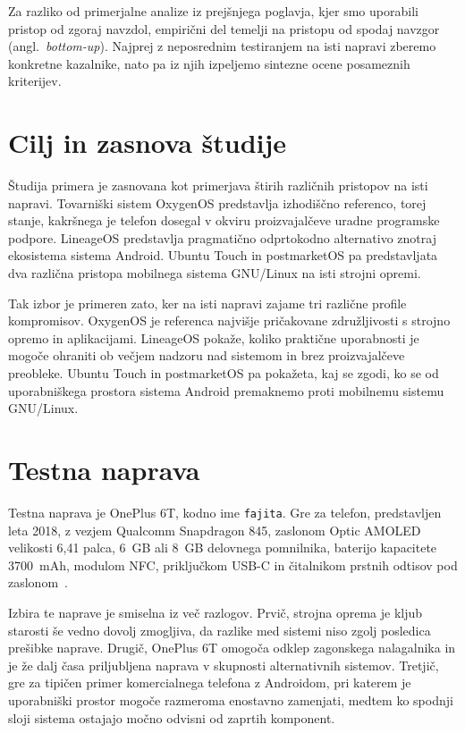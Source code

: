 \documentclass[a4paper,12pt,openright]{book}
\begin{document}
Za razliko od primerjalne analize iz prejšnjega poglavja, kjer smo uporabili pristop od zgoraj navzdol, empirični del temelji na pristopu od spodaj navzgor (angl.~\textit{bottom-up}).
Najprej z neposrednim testiranjem na isti napravi zberemo konkretne kazalnike, nato pa iz njih izpeljemo sintezne ocene posameznih kriterijev.

\section{Cilj in zasnova študije}
\label{sec:cilj_in_zasnova_studije}

Študija primera je zasnovana kot primerjava štirih različnih pristopov na isti napravi.
Tovarniški sistem OxygenOS predstavlja izhodiščno referenco, torej stanje, kakršnega je telefon dosegal v okviru proizvajalčeve uradne programske podpore.
LineageOS predstavlja pragmatično odprtokodno alternativo znotraj ekosistema sistema Android.
Ubuntu Touch in postmarketOS pa predstavljata dva različna pristopa mobilnega sistema GNU/Linux na isti strojni opremi.

Tak izbor je primeren zato, ker na isti napravi zajame tri različne profile kompromisov.
OxygenOS je referenca najvišje pričakovane združljivosti s strojno opremo in aplikacijami.
LineageOS pokaže, koliko praktične uporabnosti je mogoče ohraniti ob večjem nadzoru nad sistemom in brez proizvajalčeve preobleke.
Ubuntu Touch in postmarketOS pa pokažeta, kaj se zgodi, ko se od uporabniškega prostora sistema Android premaknemo proti mobilnemu sistemu GNU/Linux.

\section{Testna naprava}
\label{sec:testna_naprava}

Testna naprava je OnePlus 6T, kodno ime \texttt{fajita}.
Gre za telefon, predstavljen leta 2018, z vezjem Qualcomm Snapdragon 845, zaslonom Optic AMOLED velikosti 6{,}41 palca, 6~GB ali 8~GB delovnega pomnilnika, baterijo kapacitete 3700~mAh, modulom NFC, priključkom USB-C in čitalnikom prstnih odtisov pod zaslonom~\cite{oneplus_6t_specs}.

Izbira te naprave je smiselna iz več razlogov.
Prvič, strojna oprema je kljub starosti še vedno dovolj zmogljiva, da razlike med sistemi niso zgolj posledica prešibke naprave.
Drugič, OnePlus 6T omogoča odklep zagonskega nalagalnika in je že dalj časa priljubljena naprava v skupnosti alternativnih sistemov.
Tretjič, gre za tipičen primer komercialnega telefona z Androidom, pri katerem je uporabniški prostor mogoče razmeroma enostavno zamenjati, medtem ko spodnji sloji sistema ostajajo močno odvisni od zaprtih komponent.
\end{document}
